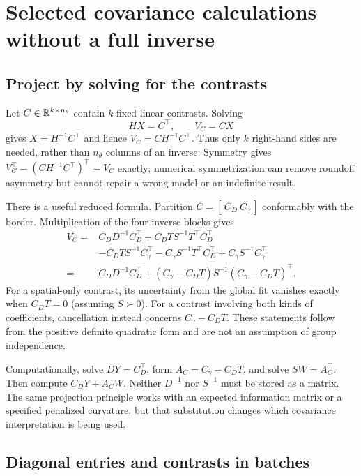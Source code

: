 \section{Selected covariance calculations without a full inverse}
\label{cov-selected}

\subsection{Project by solving for the contrasts}
\label{cov-projection}

Let $C\in\mathbb R^{k\times n_\theta}$ contain $k$ fixed linear contrasts.
Solving
\begin{equation}
 HX=C^\top,\qquad V_C=CX
 \label{cov-selected-solve}
\end{equation}
gives $X=H^{-1}C^\top$ and hence $V_C=CH^{-1}C^\top$.
Thus only $k$ right-hand sides are needed, rather than $n_\theta$ columns
of an inverse.  Symmetry gives
$V_C^\top=(CH^{-1}C^\top)^\top=V_C$ exactly; numerical
symmetrization can remove roundoff asymmetry but cannot repair a wrong
model or an indefinite result.

There is a useful reduced formula.  Partition $C=[\,C_D\ C_\gamma\,]$
conformably with the border.  Multiplication of the four inverse blocks
gives
\begin{align}
 V_C={}&C_DD^{-1}C_D^\top+C_DTS^{-1}T^\top C_D^\top\\
 &-C_DTS^{-1}C_\gamma^\top
       -C_\gamma S^{-1}T^\top C_D^\top
       +C_\gamma S^{-1}C_\gamma^\top\\
 ={}&C_DD^{-1}C_D^\top+
       (C_\gamma-C_DT)S^{-1}(C_\gamma-C_DT)^\top .
 \label{cov-reduced-contrast}
\end{align}
For a spatial-only contrast, its uncertainty from the global fit vanishes
exactly when $C_DT=0$ (assuming $S\succ0$).  For a contrast involving
both kinds of coefficients, cancellation instead concerns
$C_\gamma-C_DT$.  These statements follow from the positive definite
quadratic form and are not an assumption of group independence.

Computationally, solve $DY=C_D^\top$, form
$A_C=C_\gamma-C_DT$, and solve $SW=A_C^\top$.  Then compute
$C_DY+A_CW$.  Neither $D^{-1}$ nor $S^{-1}$ must be stored as a
matrix.  The same projection principle works with an expected information
matrix or a specified penalized curvature, but that substitution changes
which covariance interpretation is being used.

\subsection{Diagonal entries and contrasts in batches}
\label{cov-diagonal}

